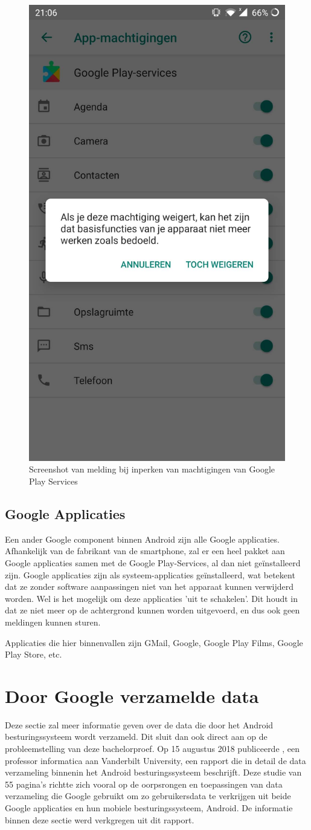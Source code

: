 \begin{figure}
    \centering
    \includegraphics[width=0.4\linewidth]{img/machtigingen_melding.jpg}
    \caption{Screenshot van melding bij inperken van machtigingen van Google Play Services}
    \label{fig:permissions2}
\end{figure}

\subsection{Google Applicaties}

Een ander Google component binnen Android zijn alle Google applicaties. Afhankelijk van de fabrikant van de smartphone, zal er een heel pakket aan Google applicaties samen met de Google Play-Services, al dan niet geïnstalleerd zijn. Google applicaties zijn als systeem-applicaties geïnstalleerd, wat betekent dat ze zonder software aanpassingen niet van  het apparaat kunnen verwijderd worden. Wel is het mogelijk om deze applicaties 'uit te schakelen'. Dit houdt in dat ze niet meer op de achtergrond kunnen worden uitgevoerd, en dus ook geen meldingen kunnen sturen.

Applicaties die hier binnenvallen zijn GMail, Google, Google Play Films, Google Play Store, etc.

\section{Door Google verzamelde data}

Deze sectie zal meer informatie geven over de data die door het Android besturingssysteem wordt verzameld. Dit sluit dan ook direct aan op de probleemstelling van deze bachelorproef. Op 15 augustus 2018 publiceerde \textcite{schmidt_google-data-collection}, een professor informatica aan Vanderbilt University, een rapport die in detail de data verzameling binnenin het Android besturingssysteem beschrijft. Deze studie van 55 pagina's richtte zich vooral op de oorpsrongen en toepassingen van data verzameling die Google gebruikt om zo gebruikersdata te verkrijgen uit beide Google applicaties en hun mobiele besturingssysteem, Android. De informatie binnen deze sectie werd verkgregen uit dit rapport.

